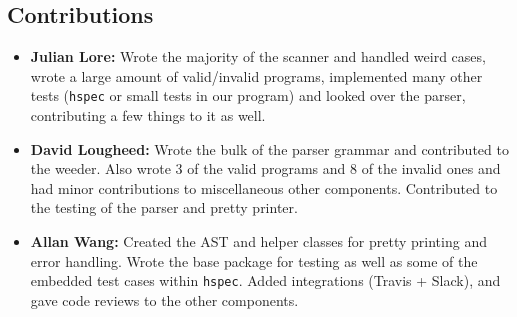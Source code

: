 \documentclass[11pt]{article}
\begin{document}
\subsection{Contributions}
\label{sec:orgf509078}
\begin{itemize}
\item \textbf{Julian Lore:} Wrote the majority of the scanner and handled weird
cases, wrote a large amount of valid/invalid programs, implemented
many other tests (\texttt{hspec} or small tests in our program) and looked
over the parser, contributing a few things to it as well.
\item \textbf{David Lougheed:} Wrote the bulk of the parser grammar and contributed to
the weeder. Also wrote 3 of the valid programs and 8 of the
invalid ones and had minor contributions to miscellaneous other components.
Contributed to the testing of the parser and pretty printer.
\item \textbf{Allan Wang:} Created the AST and helper classes for pretty printing
and error handling.  Wrote the base package for testing as well as
some of the embedded test cases within \texttt{hspec}.  Added integrations
(Travis + Slack), and gave code reviews to the other components.
\end{itemize}
\end{document}
